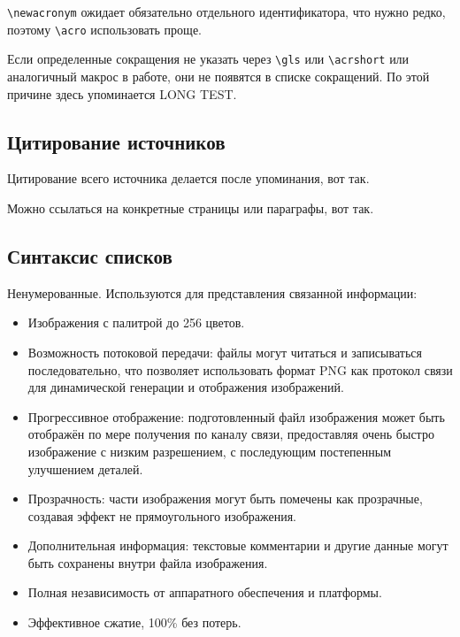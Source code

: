 \documentclass[a4paper,12pt]{report}
\begin{document}
\verb|\newacronym| ожидает обязательно отдельного идентификатора, что нужно редко, 
поэтому \verb|\acro| использовать проще.

Если определенные сокращения не указать через 
\verb|\gls| или \verb|\acrshort| или аналогичный макрос в работе,
они не появятся в списке сокращений.
По этой причине здесь упоминается \acrshort{LONG TEST}.

\subsection{Цитирование источников}

Цитирование всего источника делается после упоминания, вот так\cite{gif_unusable_reason}.

Можно ссылаться на конкретные страницы или параграфы, вот так\cite[12.2.]{png_spec}.

\subsection{Синтаксис списков}

Ненумерованные. Используются для представления связанной информации:

\begin{itemize}
    \item
        Изображения с палитрой до 256 цветов.
        
    \item
        Возможность потоковой передачи:
        файлы могут читаться и записываться последовательно, что позволяет использовать формат
        PNG как протокол связи для динамической генерации и отображения изображений.

    \item
        Прогрессивное отображение: подготовленный файл изображения может быть
        отображён по мере получения по каналу связи,
        предоставляя очень быстро изображение с низким разрешением,
        с последующим постепенным улучшением деталей.

    \item
        Прозрачность: части изображения могут быть помечены как прозрачные,
        создавая эффект не прямоугольного изображения.

    \item 
        Дополнительная информация: текстовые комментарии и другие данные могут быть
        сохранены внутри файла изображения.

    \item
        Полная независимость от аппаратного обеспечения и платформы.

    \item
        Эффективное сжатие, 100\% без потерь.
\end{itemize}
\end{document}
